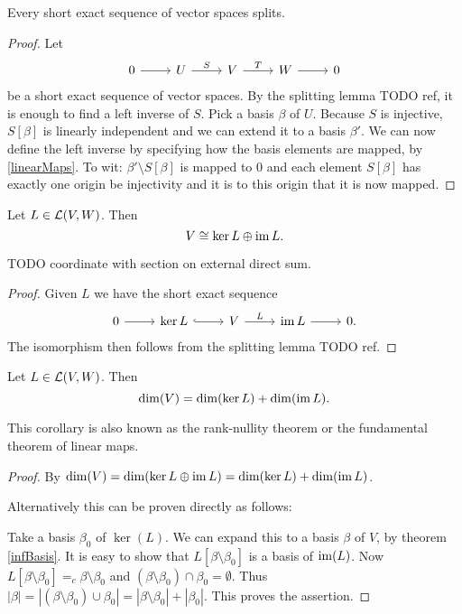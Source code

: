 \begin{theorem}
Every short exact sequence of vector spaces splits.
\end{theorem}
\begin{proof}
Let
\[ \begin{tikzcd}
0 \rar & U \rar{S} & V \rar{T} & W \rar & 0
\end{tikzcd} \]
be a short exact sequence of vector spaces.
By the splitting lemma TODO ref, it is enough to find a left inverse of $S$. Pick a basis $\beta$ of $U$. Because $S$ is injective, $S[\beta]$ is linearly independent and we can extend it to a basis $\beta'$. We can now define the left inverse by specifying how the basis elements are mapped, by \ref{linearMaps}. To wit: $\beta'\setminus S[\beta]$ is mapped to $0$ and each element $S[\beta]$ has exactly one origin be injectivity and it is to this origin that it is now mapped.
\end{proof}
\begin{corollary} \label{directSumKernelImage}
Let $L \in \operatorname{\mathcal{L}}(V,W)$. Then
\[ V \cong \ker L \oplus \operatorname{im} L. \]
\end{corollary}
TODO coordinate with section on external direct sum.
\begin{proof}
Given $L$ we have the short exact sequence
\[ \begin{tikzcd}
0 \rar & \ker L \ar[r, hook] & V \rar{L} & \im L \rar & 0.
\end{tikzcd} \]
The isomorphism then follows from the splitting lemma TODO ref.
\end{proof}
\begin{corollary} \label{dimensionLinearMaps}
Let $L \in \operatorname{\mathcal{L}}(V,W)$. Then
\[ \dim(V) = \dim(\ker L) + \dim(\operatorname{im} L). \]
\end{corollary}
This corollary is also known as the rank-nullity theorem or the fundamental theorem of linear maps.
\begin{proof}
By $\dim(V) = \dim(\ker L \oplus \operatorname{im} L) = \dim(\ker L) + \dim(\operatorname{im} L)$.

Alternatively this can be proven directly as follows:

Take a basis $\beta_0$ of $\ker(L)$. We can expand this to a basis $\beta$ of $V$, by theorem \ref{infBasis}. It is easy to show that $L[\beta\setminus \beta_0]$ is a basis of $\operatorname{im}(L)$. Now $L[\beta\setminus \beta_0] =_c \beta\setminus \beta_0$ and $(\beta\setminus \beta_0) \cap \beta_0 = \emptyset$. Thus $|\beta| = |(\beta\setminus \beta_0) \cup \beta_0| = |\beta\setminus \beta_0| + |\beta_0|$. This proves the assertion.
\end{proof}
